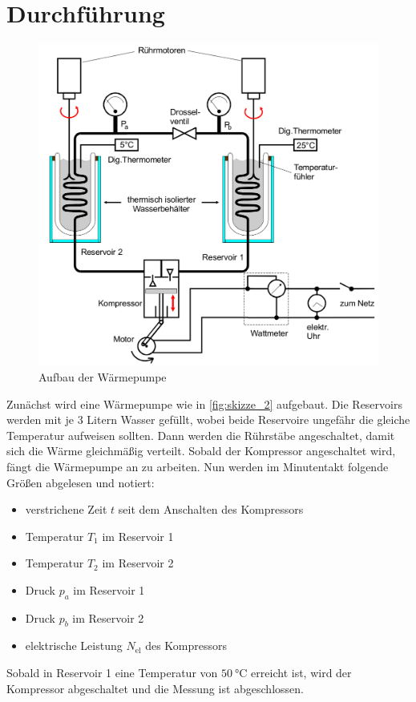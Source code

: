 \section{Durchführung}
\label{sec:Durchführung}


\begin{figure}
    \centering
    \includegraphics[width=\textwidth/2]{images/skizze_2.png}
    \caption{Aufbau der Wärmepumpe\cite{V206}}
    \label{fig:skizze_2}
\end{figure}

Zunächst wird eine Wärmepumpe wie in \autoref{fig:skizze_2} aufgebaut.
Die Reservoirs werden mit je 3 Litern Wasser gefüllt, wobei beide Reservoire ungefähr die gleiche Temperatur aufweisen sollten.
Dann werden die Rührstäbe angeschaltet, damit sich die Wärme gleichmäßig verteilt.
Sobald der Kompressor angeschaltet wird, fängt die Wärmepumpe an zu arbeiten.
Nun werden im Minutentakt folgende Größen abgelesen und notiert:
\begin{itemize}
    \item verstrichene Zeit $t$ seit dem Anschalten des Kompressors
    \item Temperatur $T_1$ im Reservoir 1
    \item Temperatur $T_2$ im Reservoir 2
    \item Druck $p_a$ im Reservoir 1
    \item Druck $p_b$ im Reservoir 2
    \item elektrische Leistung $N_\text{el}$ des Kompressors
\end{itemize}

Sobald in Reservoir 1 eine Temperatur von $\SI{50}{\celsius}$ erreicht ist, wird der Kompressor abgeschaltet und die Messung ist abgeschlossen.